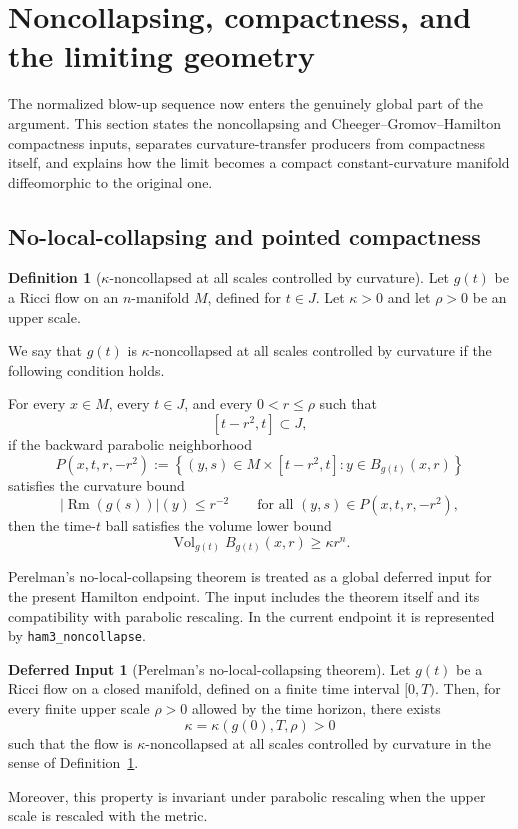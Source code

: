 \documentclass[11pt]{article}
\theoremstyle{plain}
\theoremstyle{definition}
\newtheorem{definition}[theorem]{Definition}
\newtheorem{deferred}[theorem]{Deferred Input}
\theoremstyle{remark}
\newcommand{\Rm}{\operatorname{Rm}}
\newcommand{\Vol}{\operatorname{Vol}}
\newcommand{\norm}[1]{\left|#1\right|}
\newcommand{\leanref}[1]{\nolinkurl{#1}}
\begin{document}
\section{Noncollapsing, compactness, and the limiting geometry}
\label{sec:global-interfaces}

The normalized blow-up sequence now enters the genuinely global part of the
argument.  This section states the noncollapsing and
Cheeger--Gromov--Hamilton compactness inputs, separates curvature-transfer
producers from compactness itself, and explains how the limit becomes a
compact constant-curvature manifold diffeomorphic to the original one.

\subsection{No-local-collapsing and pointed compactness}

\begin{definition}[\texorpdfstring{$\kappa$}{kappa}-noncollapsed at all scales controlled by curvature]
\label{def:kappa-noncollapsed}
Let $g(t)$ be a Ricci flow on an $n$-manifold $M$, defined for
$t\in J$. Let $\kappa>0$ and let $\rho>0$ be an upper scale.

We say that $g(t)$ is $\kappa$-noncollapsed at all scales controlled by
curvature if the following condition holds.

For every $x\in M$, every $t\in J$, and every $0<r\le\rho$ such that
\[
[t-r^2,t]\subset J,
\]
if the backward parabolic neighborhood
\[
P(x,t,r,-r^2)
:=
\left\{
(y,s)\in M\times[t-r^2,t]
:
y\in B_{g(t)}(x,r)
\right\}
\]
satisfies the curvature bound
\[
\norm{\Rm(g(s))}(y)\le r^{-2}
\qquad
\text{for all }(y,s)\in P(x,t,r,-r^2),
\]
then the time-$t$ ball satisfies the volume lower bound
\[
\Vol_{g(t)} B_{g(t)}(x,r)\ge \kappa r^n.
\]
\end{definition}

Perelman's no-local-collapsing theorem \cite{Perelman1} is treated as a global deferred input
for the present Hamilton endpoint.  The input includes the theorem itself and
its compatibility with parabolic rescaling.  In the current endpoint it is
represented by \leanref{ham3_noncollapse}.

\begin{deferred}[Perelman's no-local-collapsing theorem]
\label{bb:no-local-collapsing}
Let $g(t)$ be a Ricci flow on a closed manifold, defined on a finite time
interval $[0,T)$. Then, for every finite upper scale $\rho>0$ allowed by the
time horizon, there exists
\[
\kappa=\kappa(g(0),T,\rho)>0
\]
such that the flow is $\kappa$-noncollapsed at all scales controlled by
curvature in the sense of Definition~\ref{def:kappa-noncollapsed}.

Moreover, this property is invariant under parabolic rescaling when the upper
scale is rescaled with the metric.
\end{deferred}
\end{document}
